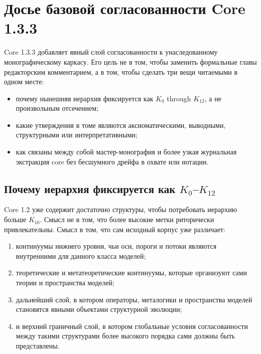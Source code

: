 \section{Досье базовой согласованности Core 1.3.3}
\label{sec:oc13-foundational-consistency}

Core 1.3.3 добавляет явный слой согласованности к унаследованному монографическому каркасу.
Его цель не в том, чтобы заменить формальные главы редакторским комментарием,
а в том, чтобы сделать три вещи читаемыми в одном месте:

\begin{itemize}
\item почему нынешняя иерархия фиксируется как \(K_0\) through \(K_{12}\), а
      не произвольным отсечением;
\item какие утверждения в томе являются аксиоматическими, выводными,
      структурными или интерпретативными;
\item как связаны между собой мастер-монография и более узкая журнальная
      экстракция core без бесшумного дрейфа в охвате или нотации.
\end{itemize}

\subsection{Почему иерархия фиксируется как \texorpdfstring{$K_0$--$K_{12}$}{K0-K12}}

Core 1.2 уже содержит достаточно структуры, чтобы потребовать иерархию
больше \(K_{10}\). Смысл не в том, что более высокие метки риторически
привлекательны. Смысл в том, что сам исходный корпус уже различает:

\begin{enumerate}
\item континуумы нижнего уровня, чьи оси, пороги и потоки являются внутренними
      для данного класса моделей;
\item теоретические и метатеоретические континуумы, которые организуют сами
      теории и пространства моделей;
\item дальнейший слой, в котором операторы, металогики и пространства моделей
      становятся явными объектами структурной эволюции;
\item и верхний граничный слой, в котором глобальные условия согласованности
      между такими структурами более высокого порядка сами должны быть
      представлены.
\end{enumerate}

